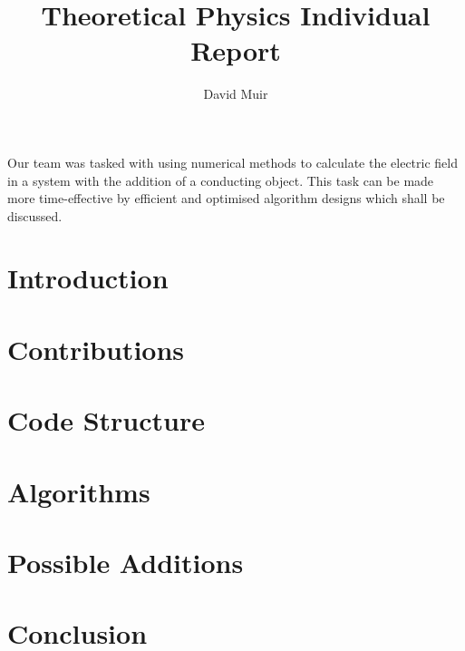 \documentclass{article}
\begin{document}
\title{Theoretical Physics Individual Report}
\author{David Muir}
\date{}
\maketitle

\tableofcontents

\abstract
    Our team was tasked with using numerical methods to calculate the electric field in a system with the addition of a conducting object. This task can be made more time-effective by efficient and optimised algorithm designs which shall be discussed.

\section{Introduction}

\section{Contributions}

\section{Code Structure}

\section{Algorithms}

\section{Possible Additions}

\section{Conclusion}
\end{document}
